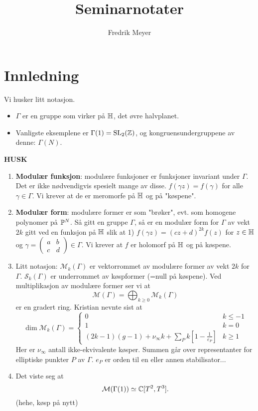 \documentclass[11pt, english]{article}
\begin{document}
\title{Seminarnotater}
\author{Fredrik Meyer}
\maketitle 

\section{Innledning}

Vi husker litt notasjon.
\begin{itemize}
\item $\Gamma$ er en gruppe som virker på $\mathbb{H}$, det øvre halvplanet.
\item Vanligste eksemplene er $\Gamma(1)=\operatorname{SL}_2(\mathbb{Z})$, og kongruensundergruppene av denne: $\Gamma(N)$.
\end{itemize}


\textbf{HUSK}

\begin{enumerate}
\item \textbf{Modulær funksjon}: modulære funksjoner er funksjoner invariant under $\Gamma$. Det er ikke nødvendigvis spesielt mange av disse. $f(\gamma z)=f(\gamma)$ for alle $\gamma \in \Gamma$. Vi krever at de er meromorfe på $\mathbb{H}$ og på "køspene".
\item \textbf{Modulær form}: modulære former er som "brøker", evt. som homogene polynomer på $\mathbb{P}^N$. Så gitt en gruppe $\Gamma$, så er en modulær form for $\Gamma$ av vekt $2k$ gitt ved en funksjon på $\mathbb{H}$ slik at 1) $f(\gamma z)=(cz+d)^{2k}f(z)$ for $z \in \mathbb{H}$ og $\gamma=\begin{pmatrix} a & b \\ c & d \end{pmatrix} \in \Gamma$. Vi krever at $f$ er holomorf på $\mathbb{H}$ og på køspene. 
\item Litt notasjon: $\mathcal M_k(\Gamma)$ er vektorrommet av modulære former av vekt $2k$ for $\Gamma$. $\mathcal S_k(\Gamma)$ er underrommet av køspformer (=null på køspene). Ved multiplikasjon av modulære former ser vi at 
$$
\mathcal M( \Gamma) = \bigoplus_{k \geq 0} \mathcal M_k(\Gamma)
$$
er en gradert ring. Kristian nevnte sist at 
\[
\dim \mathcal M_k(\Gamma) = \begin{cases} 0 & k \leq -1 \\
1 & k = 0 \\
(2k-1)(g-1) + \nu_\infty k + \sum_P k\left[1-\frac{1}{e_P}\right] & k \geq 1
\end{cases}
\]
Her er $\nu_\infty$ antall ikke-ekvivalente køsper. Summen går over representanter for elliptiske punkter $P$ av $\Gamma$. $e_P$ er orden til en eller annen stabilisator... 
\item Det viste seg at
\[
\mathcal M (\Gamma(1)) \simeq \mathbb{C}[T^2,T^3].
\]
(hehe, køsp på nytt)
\end{enumerate}
\end{document}
